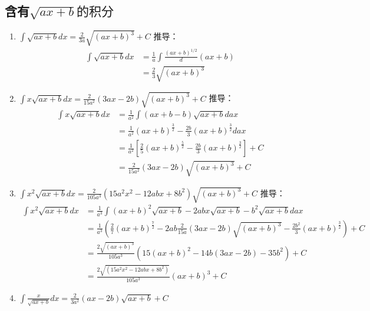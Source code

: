\subsection{含有$\sqrt{{ax+b}}的积分$}
\begin{enumerate}
	\item $\int \sqrt{ax+b}dx=\frac{2}{3a}\sqrt{\left(ax+b\right)^3}+C$
	推导：
	\begin{equation}
		\begin{split}
			\int \sqrt{ax+b}dx&= \frac{1}{a}\int \frac{\left(ax+b\right)^{1/2}}d(ax+b)\\ 
			&=\frac{2}{3} \sqrt{\left(ax+b\right)^3}
		\end{split}
	\end{equation}
	\item $\int x\sqrt{ax+b}dx=\frac{2}{15a^2}(3ax-2b)\sqrt{\left(ax+b\right)^3}+C$
	推导：
	\begin{equation}
		\begin{split}
			\int x\sqrt{ax+b}dx&=\frac{1}{a^2}\int(ax+b-b)\sqrt{ax+b}d{ax}\\ 
			&= \frac{1}{a^2}\left(ax+b\right)^{\frac{3}{2}}-\frac{2b}{3}(ax+b)^{\frac{3}{2}}d{ax}\\ 
			&=\frac{1}{a^2}\left[\frac{2}{5}\left(ax+b\right)^{\frac{5}{2}}-\frac{2b}{3}\left(ax+b\right)^{\frac{3}{2}}\right]+C\\ 
			&= \frac{2}{15a^2}(3ax-2b)\sqrt{\left(ax+b\right)^3}+C
		\end{split}
	\end{equation}
	\item $\int x^2\sqrt{ax+b}dx=\frac{2}{105a^3}(15a^2x^2-12abx+8b^2)\sqrt{\left(ax+b\right)^3}+C$
	推导：
	\begin{equation}
		\begin{split}
			\int x^2\sqrt{ax+b}dx &=\frac{1}{a^3}\int (ax+b)^2\sqrt{ax+b}-2abx\sqrt{ax+b}-b^2\sqrt{ax+b}d{ax} \\
				&=\frac{1}{a^3}\left(\frac{2}{7}(ax+b)^{\frac{7}{2}}-2ab\frac{2}{15a}(3ax-2b)\sqrt{\left(ax+b\right)^3}-\frac{2b^2}{3}(ax+b)^{\frac{3}{2}}\right)+C\\ 
				&=\frac{2\sqrt{\left(ax+b\right)^3}}{105a^3}\left(15(ax+b)^2-14b(3ax-2b)-35b^2\right)+C\\ 
				&=\frac{2\sqrt{(15a^2x^2-12abx+8b^2)}}{105a^3}\left(ax+b\right)^3+C
		\end{split}
	\end{equation}
	\item $\int \frac{x}{\sqrt{ax+b}}dx=\frac{2}{3a^2}(ax-2b)\sqrt{ax+b}+C$

\end{enumerate}
